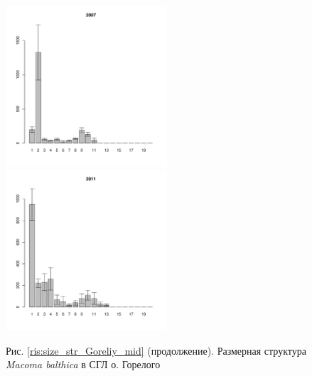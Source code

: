 \begin{figure}[h]

\begin{multicols}{3}
\hfill
\includegraphics[width=60mm]{../White_Sea/Luvenga_Goreliy/middle_2007_.pdf}
\hfill
\includegraphics[width=60mm]{../White_Sea/Luvenga_Goreliy/middle_2011_.pdf}
\end{multicols}


\begin{center}
Рис. \ref{ris:size_str_Goreliy_mid} (продолжение). Размерная структура {\it Macoma balthica} в СГЛ о. Горелого

\end{center}
\end{figure}



